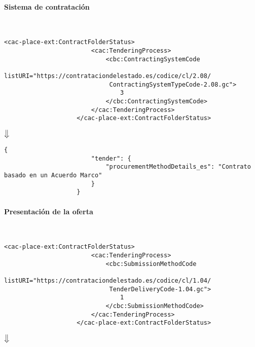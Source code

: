             \paragraph{Sistema de contratación} \mbox{}\\
                \begin{lstlisting}[language=lXML]
                    <cac-place-ext:ContractFolderStatus>
                        <cac:TenderingProcess>
                            <cbc:ContractingSystemCode
                             listURI="https://contrataciondelestado.es/codice/cl/2.08/
                             ContractingSystemTypeCode-2.08.gc">
                                3
                            </cbc:ContractingSystemCode>
                        </cac:TenderingProcess>
                    </cac-place-ext:ContractFolderStatus>
                \end{lstlisting}
                
                \begin{center}
                    $\big\Downarrow$
                \end{center}
                
                \begin{lstlisting}[language=lJSON]
                    {
                        "tender": {
                            "procurementMethodDetails_es": "Contrato basado en un Acuerdo Marco"
                        }
                    }
                \end{lstlisting}
\newpage
            \paragraph{Presentación de la oferta} \mbox{}\\
                \begin{lstlisting}[language=lXML]
                    <cac-place-ext:ContractFolderStatus>
                        <cac:TenderingProcess>
                            <cbc:SubmissionMethodCode
                             listURI="https://contrataciondelestado.es/codice/cl/1.04/
                             TenderDeliveryCode-1.04.gc">
                                1
                            </cbc:SubmissionMethodCode>
                        </cac:TenderingProcess>
                    </cac-place-ext:ContractFolderStatus>
                \end{lstlisting}
                
                \begin{center}
                    $\big\Downarrow$
                \end{center}
                
